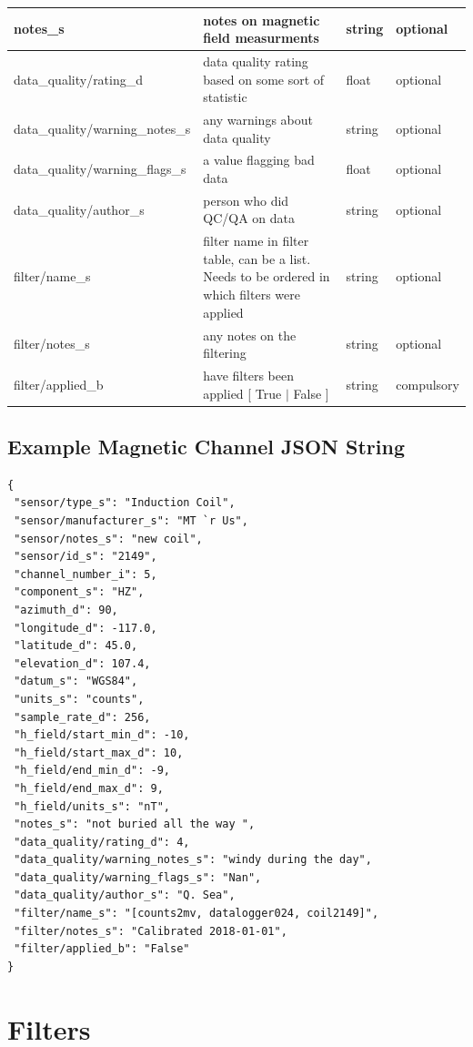 \documentclass{article}
\begin{document}
\begin{table}[htb!]
\begin{tabular}{|l|p{3in}|l|l|}
		notes\_s & notes on magnetic field measurments & string &  optional \\ \hline
		data\_quality/rating\_d & data quality rating based on some sort of statistic & float &  optional \\ \hline
		data\_quality/warning\_notes\_s & any warnings about data quality & string &   optional \\ \hline
		data\_quality/warning\_flags\_s & a value flagging bad data  & float &  optional \\ \hline
		data\_quality/author\_s & person who did QC/QA on data & string &   optional \\ \hline
		filter/name\_s & filter name in filter table, can be a list. Needs to be ordered in which filters were applied & string &  optional \\ \hline
		filter/notes\_s & any notes on the filtering & string &  optional \\ \hline
		filter/applied\_b & have filters been applied [ True $|$ False ] & string & compulsory \\ \hline
		\end{tabular}
	\label{tab:magnetic}
\end{table}

\newpage
\subsection{Example Magnetic Channel JSON String}

\begin{verbatim}
{
 "sensor/type_s": "Induction Coil",
 "sensor/manufacturer_s": "MT `r Us",
 "sensor/notes_s": "new coil",
 "sensor/id_s": "2149",
 "channel_number_i": 5,
 "component_s": "HZ",
 "azimuth_d": 90,
 "longitude_d": -117.0,
 "latitude_d": 45.0,
 "elevation_d": 107.4,
 "datum_s": "WGS84",
 "units_s": "counts",
 "sample_rate_d": 256,
 "h_field/start_min_d": -10,
 "h_field/start_max_d": 10,
 "h_field/end_min_d": -9,
 "h_field/end_max_d": 9,
 "h_field/units_s": "nT",
 "notes_s": "not buried all the way ",
 "data_quality/rating_d": 4,
 "data_quality/warning_notes_s": "windy during the day",
 "data_quality/warning_flags_s": "Nan",
 "data_quality/author_s": "Q. Sea",
 "filter/name_s": "[counts2mv, datalogger024, coil2149]",
 "filter/notes_s": "Calibrated 2018-01-01",
 "filter/applied_b": "False"
}
\end{verbatim}

\newpage
\section{Filters}
\end{document}

